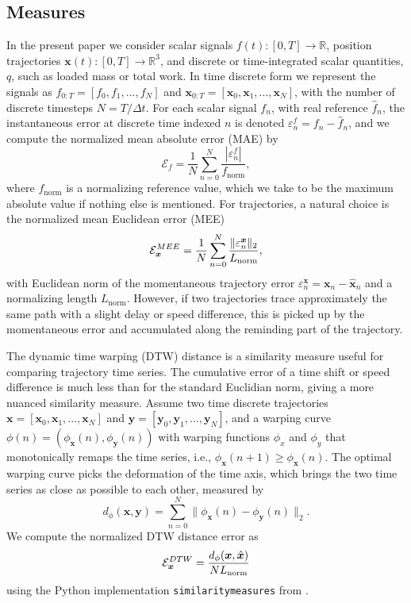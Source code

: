 \documentclass[10pt]{article}
\newcommand\norm[1]{\lVert#1\rVert}
\begin{document}
\subsection{Measures}
In the present paper we consider scalar signals $f(t):[0,T]\to\mathbb{R}$, 
position trajectories $\bm{x}(t):[0,T]\to\mathbb{R}^{3}$, and discrete or 
time-integrated scalar quantities, $q$, such as loaded mass or total work. 
In time discrete form we represent the signals as $f_{0:T} = [f_{0},f_{1},...,f_{N}]$
and $\bm{x}_{0:T} = [\bm{x}_0,\bm{x}_1,...,\bm{x}_N]$, with 
the number of discrete timesteps $N = T/\Delta t$.
For each scalar signal $f_n$, with real reference $\hat{f}_n$, 
the instantaneous error at discrete time indexed $n$ is denoted $\varepsilon^f_n = f_n - \hat{f}_n$,
and we compute the normalized mean absolute error (MAE) by
\begin{equation}
  \mathcal{E}_f = \frac{1}{N}  \sum_{n=0}^{N}{\frac{\left|\varepsilon^f_n\right|}{f_\mathrm{norm}}},
\end{equation}
where $f_\mathrm{norm}$ is a normalizing reference value, which we take to be the maximum absolute
value if nothing else is mentioned.  For trajectories, a natural choice is the normalized mean Euclidean error (MEE)
\begin{equation}
  \mathcal{E}^{\sc{MEE}}_{\bm{x}} = \frac{1}{N}  \sum_{n=0}^{N}{\frac{\norm{\varepsilon^{\bm{x}}_n}_2}{L_\mathrm{norm}}},
\end{equation}
with Euclidean norm of the momentaneous trajectory error $\varepsilon^{\bm{x}}_n = \bm{x}_n - \hat{\bm{x}}_n$ 
and a normalizing length $L_\mathrm{norm}$.  However, if two trajectories trace approximately the same 
path with a slight delay or speed difference, this is picked up by the momentaneous error and accumulated along the reminding part of the trajectory.  

The dynamic time warping (DTW) distance \cite{Berndt1994} is a similarity measure useful for comparing trajectory time series. The cumulative error of a time shift or speed difference is much less than for the standard Euclidian norm, giving a more nuanced similarity measure. 
Assume two time discrete trajectories $\bm{x} = [\bm{x}_0,\bm{x}_1,...,\bm{x}_N]$ and $\bm{y} = [\bm{y}_0,\bm{y}_1,...,\bm{y}_N]$,
and a warping curve $\phi(n) = (\phi_{\bm{x}}(n),\phi_{\bm{y}}(n))$ with warping functions $\phi_x$ and 
$\phi_y$ that monotonically remaps the time series, i.e., $\phi_{\bm{x}}(n+1) \geq \phi_{\bm{x}}(n)$.  
The optimal warping curve picks the deformation of the time axis, which brings the two time series
as close as possible to each other, measured by
\begin{equation*}
    d_\phi (\bm{x},\bm{y}) = \sum_{n=0}^N \norm{\phi_{\bm{x}}(n)-\phi_{\bm{y}}(n)}_2.
\end{equation*}
We compute the normalized DTW distance error as
\begin{equation}
  \mathcal{E}^{\sc{DTW}}_{\bm{x}} = \frac{d_\phi(\bm{x},\hat{\bm{x}})}{N L_\mathrm{norm}}
\end{equation}
using the Python implementation \texttt
{similaritymeasures} from \cite{Jekel2019}. 
\end{document}
